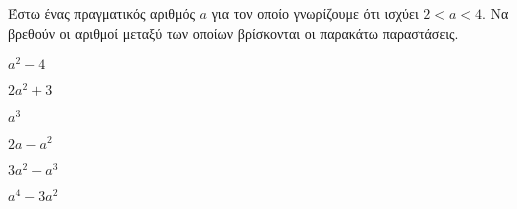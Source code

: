 Έστω ένας πραγματικός αριθμός $ a $ για τον οποίο γνωρίζουμε ότι ισχύει $ 2<a<4 $. Να βρεθούν οι αριθμοί μεταξύ των οποίων βρίσκονται οι παρακάτω παραστάσεις.
\begin{multicols}{3}
\begin{alist}
\item $ a^2-4 $
\item $ 2a^2+3 $
\item $ a^3 $
\item $ 2a-a^2 $
\item $ 3a^2-a^3 $
\item $ a^4-3a^2 $
\end{alist}
\end{multicols}

